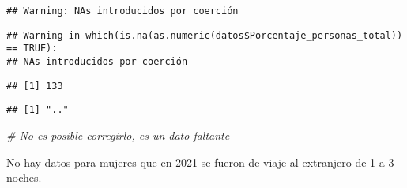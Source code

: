 \documentclass[notspecified,article,submit,moreauthors,pdftex]{Definitions/mdpi}
\newenvironment{Shaded}{\begin{snugshade}}{\end{snugshade}}
\newcommand{\CommentTok}[1]{\textcolor[rgb]{0.56,0.35,0.01}{\textit{#1}}}
\newcommand{\ConstantTok}[1]{\textcolor[rgb]{0.56,0.35,0.01}{#1}}
\newcommand{\DecValTok}[1]{\textcolor[rgb]{0.00,0.00,0.81}{#1}}
\newcommand{\FunctionTok}[1]{\textcolor[rgb]{0.13,0.29,0.53}{\textbf{#1}}}
\newcommand{\NormalTok}[1]{#1}
\newcommand{\OtherTok}[1]{\textcolor[rgb]{0.56,0.35,0.01}{#1}}
\newcommand{\SpecialCharTok}[1]{\textcolor[rgb]{0.81,0.36,0.00}{\textbf{#1}}}
\newcommand{\StringTok}[1]{\textcolor[rgb]{0.31,0.60,0.02}{#1}}
\begin{document}
\begin{verbatim}
## Warning: NAs introducidos por coerción
\end{verbatim}

\begin{Shaded}
\end{Shaded}

\begin{verbatim}
## Warning in which(is.na(as.numeric(datos$Porcentaje_personas_total)) == TRUE):
## NAs introducidos por coerción
\end{verbatim}

\begin{verbatim}
## [1] 133
\end{verbatim}

\begin{Shaded}
\end{Shaded}

\begin{verbatim}
## [1] ".."
\end{verbatim}

\begin{Shaded}
\begin{Highlighting}[]
\CommentTok{\# No es posible corregirlo, es un dato faltante}
\end{Highlighting}
\end{Shaded}

No hay datos para mujeres que en 2021 se fueron de viaje al extranjero
de 1 a 3 noches.

\begin{Shaded}
\end{Shaded}
\end{document}
